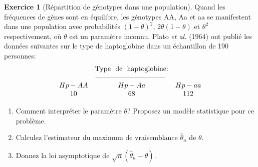 \documentclass[a4paper,11pt,fleqn]{article}
\theoremstyle{definition}
\newtheorem{exercice}{Exercice}
\begin{document}
\begin{exercice}[R\'epartition de g\'enotypes dans une population]
Quand les fr\'equences de g\`enes sont en \'equilibre, les
g\'enotypes AA, Aa et aa se manifestent dans une population avec
probabilit\'es $(1-\theta)^2$, $2\theta(1-\theta)$ et $\theta^2$
respectivement, o\`u $\theta$ est un param\`etre inconnu. Plato {\it et
al.} (1964) ont publi\'e les donn\'ees suivantes sur le type de
haptoglobine dans un \'echantillon de 190 personnes:
$$
\begin{array}{ccc}
&\text{Type \ de \ haptoglobine:}&\\\hspace{6mm}
&\text{------------------------------ }&\\
 Hp-AA& Hp-Aa & Hp-aa \\
 10&68&112
\end{array}
$$
\begin{enumerate}
\item Comment interpr\'eter le param\`etre $\theta$? Proposez un mod\`ele statistique pour ce probl\`eme.
\item  Calculez l'estimateur du maximum de vraisemblance $\hat \theta_n$ de $\theta$.
\item  Donnez la loi asymptotique de $\sqrt{n}(\hat \theta_n -
\theta)$.
\end{enumerate}
\end{exercice}
\end{document}
